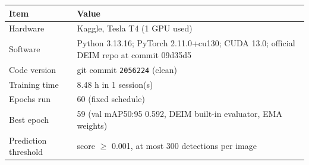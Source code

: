 \begin{tabular}{p{3.6cm}p{10.4cm}}
\toprule
Item & Value \\
\midrule
Hardware & Kaggle, Tesla T4 (1 GPU used) \\
Software & Python 3.13.16; PyTorch 2.11.0+cu130; CUDA 13.0; official DEIM repo at commit 09d35d5 \\
Code version & git commit \texttt{2056224} (clean) \\
Training time & 8.48 h in 1 session(s) \\
Epochs run & 60 (fixed schedule) \\
Best epoch & 59 (val mAP50:95 0.592, DEIM built-in evaluator, EMA weights) \\
Prediction threshold & score $\geq$ 0.001, at most 300 detections per image \\
\bottomrule
\end{tabular}

